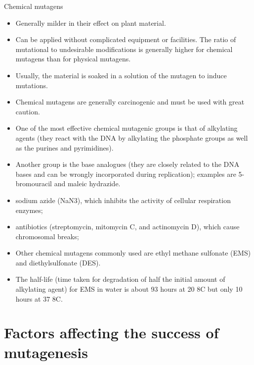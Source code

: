 \documentclass[11pt,ignorenonframetext,aspectratio=169]{beamer}
\providecommand{\tightlist}{%
  \setlength{\itemsep}{0pt}\setlength{\parskip}{0pt}}
\begin{document}
\begin{frame}{Chemical mutagens}
\protect\hypertarget{chemical-mutagens}{}
\small

\begin{itemize}
\tightlist
\item
  Generally milder in their effect on plant material.
\item
  Can be applied without complicated equipment or facilities. The ratio
  of mutational to undesirable modifications is generally higher for
  chemical mutagens than for physical mutagens.
\item
  Usually, the material is soaked in a solution of the mutagen to induce
  mutations.
\item
  Chemical mutagens are generally carcinogenic and must be used with
  great caution.
\item
  One of the most effective chemical mutagenic groups is that of
  alkylating agents (they react with the DNA by alkylating the phosphate
  groups as well as the purines and pyrimidines).
\item
  Another group is the base analogues (they are closely related to the
  DNA bases and can be wrongly incorporated during replication);
  examples are 5-bromouracil and maleic hydrazide.
\item
  sodium azide (NaN3), which inhibits the activity of cellular
  respiration enzymes;
\item
  antibiotics (streptomycin, mitomycin C, and actinomycin D), which
  cause chromosomal breaks;
\item
  Other chemical mutagens commonly used are ethyl methane sulfonate
  (EMS) and diethylsulfonate (DES).
\item
  The half-life (time taken for degradation of half the initial amount
  of alkylating agent) for EMS in water is about 93 hours at 20 8C but
  only 10 hours at 37 8C.
\end{itemize}
\end{frame}

\hypertarget{factors-affecting-the-success-of-mutagenesis}{%
\section{Factors affecting the success of
mutagenesis}\label{factors-affecting-the-success-of-mutagenesis}}
\end{document}
